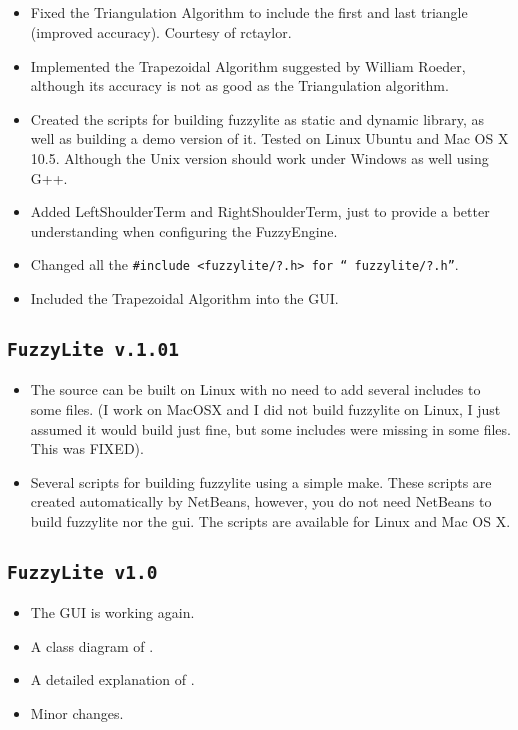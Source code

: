 	\subsection{\fl}
	\begin{itemize} 
	  \item Fixed the Triangulation Algorithm to include the first and last
	  triangle (improved accuracy). Courtesy of rctaylor.
	  \item Implemented the Trapezoidal Algorithm suggested by William Roeder,
	  although its accuracy is not as good as the Triangulation algorithm.
	  \item Created the scripts for building fuzzylite as static and dynamic
	  library, as well as building a demo version of it. Tested on Linux Ubuntu and
	  Mac OS X 10.5. Although the Unix version should work under Windows as well
	  using G++.
	  \item Added LeftShoulderTerm and RightShoulderTerm, just to provide a better
	  understanding when configuring the FuzzyEngine.
	  \item Changed all the \texttt{\#include <fuzzylite/?.h> for ``
	  fuzzylite/?.h''}.
	  \item Included the Trapezoidal Algorithm into the GUI.
	\end{itemize}

	\subsection{\texttt{FuzzyLite v.1.01}}
	\begin{itemize}
		\item 	The source can be built on Linux with no need to add several includes to some files. (I work on MacOSX and I did not build fuzzylite on Linux, I just assumed it would build just fine, but some includes were missing in some files. This was FIXED).
	\item Several scripts for building fuzzylite using a simple make. These scripts are created automatically by NetBeans, however, you do not need NetBeans to build fuzzylite nor the gui. The scripts are available for Linux and Mac OS X.
	\end{itemize}
	
	\subsection{\texttt{FuzzyLite v1.0}}
	\begin{itemize}
		\item The GUI is working again.
		\item A class diagram of \fl.
		\item A detailed explanation of \fl.
		\item Minor changes.
	\end{itemize}

